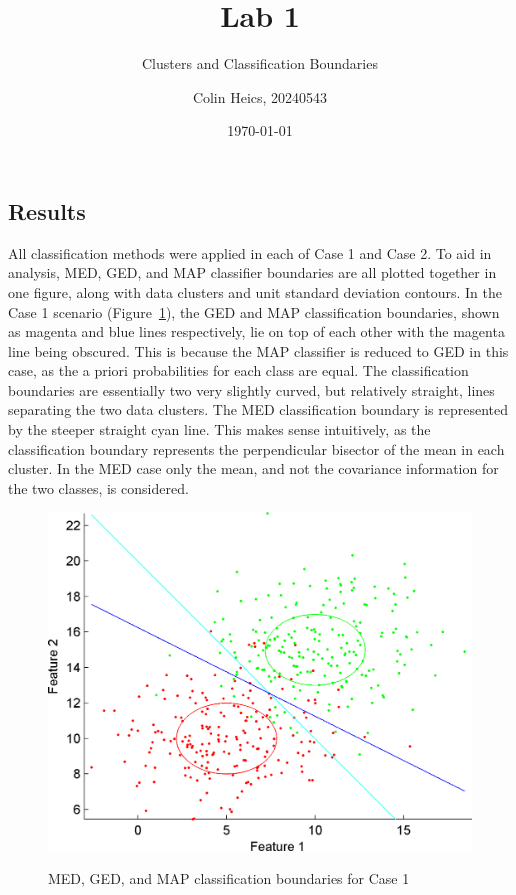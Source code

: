 \documentclass[article, 1.5space, letterpaper, 12pt, oneside, header, footer]{SydeClass}
\title{Lab 1}
\subtitle{Clusters and Classification Boundaries}
\author{Colin Heics, 20240543}
\date{\today}
\begin{document}









\subsection{Results}
All classification methods were applied in each of Case 1 and Case 2. To aid in analysis, MED, GED, and MAP classifier boundaries are all plotted together in one figure, along with data clusters and unit standard deviation contours. In the Case 1 scenario (Figure~\ref{fig:med_ged_map_classifier_case1}), the GED and MAP classification boundaries, shown as magenta and blue lines respectively, lie on top of each other with the magenta line being obscured. This is because the MAP classifier is reduced to GED in this case, as the a priori probabilities for each class are equal. The classification boundaries are essentially two very slightly curved, but relatively straight, lines separating the two data clusters. The MED classification boundary is represented by the steeper straight cyan line. This makes sense intuitively, as the classification boundary represents the perpendicular bisector of the mean in each cluster. In the MED case only the mean, and not the covariance information for the two classes, is considered.

\begin{figure}[ht]
\centering
	{
	\includegraphics[width=0.45\linewidth]{fig2a-AB_MED_MICD_MAP}
	}
	
	\caption{MED, GED, and MAP classification boundaries for Case 1}
	\label{fig:med_ged_map_classifier_case1}
\end{figure}
\end{document}
